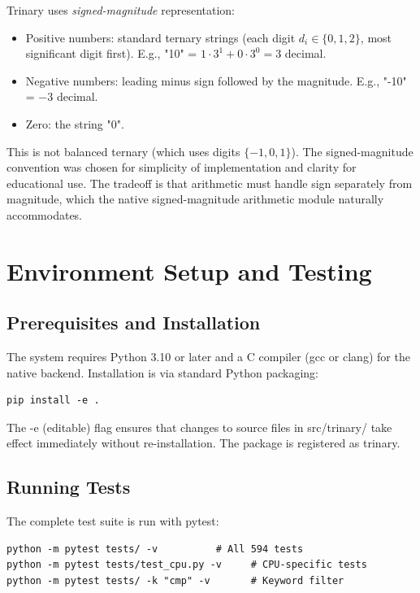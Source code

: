 \documentclass[12pt,a4paper,twoside]{book}
\theoremstyle{trinarytheorem}
\theoremstyle{trinarydefinition}
\newcommand{\code}[1]{\textsf{#1}}
\begin{document}
Trinary uses \emph{signed-magnitude} representation:
\begin{itemize}
    \item Positive numbers: standard ternary strings (each digit $d_i \in \{0,1,2\}$,
          most significant digit first). E.g., \code{"10"} = $1\cdot 3^1 + 0\cdot 3^0
          = 3$ decimal.
    \item Negative numbers: leading minus sign followed by the magnitude. E.g.,
          \code{"-10"} = $-3$ decimal.
    \item Zero: the string \code{"0"}.
\end{itemize}

This is not balanced ternary (which uses digits $\{-1,0,1\}$). The signed-magnitude
convention was chosen for simplicity of implementation and clarity for educational use.
The tradeoff is that arithmetic must handle sign separately from magnitude, which the
native signed-magnitude arithmetic module naturally accommodates.

\chapter{Environment Setup and Testing}
\label{ch:setup}

\section{Prerequisites and Installation}

The system requires Python 3.10 or later and a C compiler (gcc or clang) for the native
backend. Installation is via standard Python packaging:

\begin{verbatim}
pip install -e .
\end{verbatim}

The \code{-e} (editable) flag ensures that changes to source files in
\code{src/trinary/} take effect immediately without re-installation. The package is
registered as \code{trinary}.

\section{Running Tests}

The complete test suite is run with pytest:

\begin{verbatim}
python -m pytest tests/ -v          # All 594 tests
python -m pytest tests/test_cpu.py -v     # CPU-specific tests
python -m pytest tests/ -k "cmp" -v       # Keyword filter
\end{verbatim}
\end{document}

